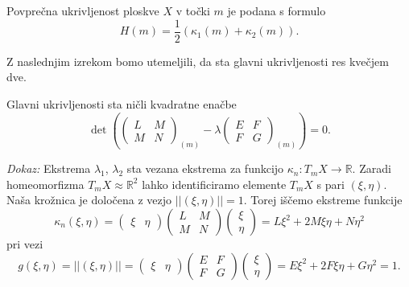 \begin{definicija}
\label{def_povprecna_ukrivljenost}
    Povprečna ukrivljenost ploskve $X$ v točki $m$ je podana s formulo 
    \begin{equation*} H(m) = \frac{1}{2} (\kappa_1(m) + \kappa_2(m) ).\end{equation*}
\end{definicija}

Z naslednjim izrekom bomo utemeljili, da sta glavni ukrivljenosti res kvečjem dve. 

\begin{izrek}
\label{izr_glavni_ukrivljenosti_sta_nicli_kvadratne_emacbe}
  Glavni ukrivljenosti sta ničli kvadratne enačbe 
  \begin{equation*} \det \left( \begin{pmatrix}
  L & M \\
  M & N
  \end{pmatrix}_{(m)} - \lambda \begin{pmatrix}
  E & F \\
  F & G
  \end{pmatrix}_{(m)}  \right) = 0. \end{equation*}
\end{izrek}
\noident
{\em Dokaz:\/}
 Ekstrema $\lambda_1$, $\lambda_2$ sta vezana ekstrema za funkcijo $\kappa_n: T_mX \to \mathbb{R}$.
 Zaradi homeomorfizma $T_mX \approx \mathbb{R}^2$ lahko identificiramo elemente $T_mX$ s pari $(\xi, \eta)$. Naša krožnica je
 določena z vezjo $\lvert\lvert (\xi, \eta) \rvert\rvert = 1$. Torej iščemo ekstreme funkcije \begin{equation*}
   \kappa_n(\xi, \eta) = \begin{pmatrix}
     \xi & \eta 
   \end{pmatrix}
   \begin{pmatrix}
     L & M \\
     M & N
   \end{pmatrix}  
   \begin{pmatrix}
     \xi \\
     \eta 
   \end{pmatrix} = L \xi^2 + 2M \xi \eta + N \eta^2
 \end{equation*}  
   pri vezi \begin{equation*}
     g(\xi, \eta)  = \lvert\lvert (\xi, \eta) \rvert\rvert = \begin{pmatrix}
       \xi & \eta 
     \end{pmatrix}
     \begin{pmatrix}
       E & F \\
       F & G
     \end{pmatrix}  
     \begin{pmatrix}
       \xi \\
       \eta 
     \end{pmatrix} = E \xi^2 + 2F \xi \eta + G \eta^2 = 1.
   \end{equation*}  

